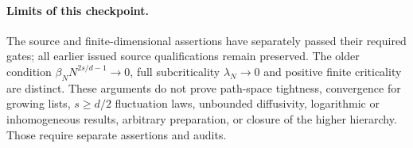 \documentclass[10pt]{article}
\begin{document}
\paragraph{Limits of this checkpoint.}
The source and finite-dimensional assertions have separately passed their required gates; all earlier issued source qualifications remain preserved. The older condition $\beta_NN^{2s/d-1}\to0$, full subcriticality $\lambda_N\to0$ and positive finite criticality are distinct. These arguments do not prove path-space tightness, convergence for growing lists, $s\ge d/2$ fluctuation laws, unbounded diffusivity, logarithmic or inhomogeneous results, arbitrary preparation, or closure of the higher hierarchy. Those require separate assertions and audits.
\end{document}
